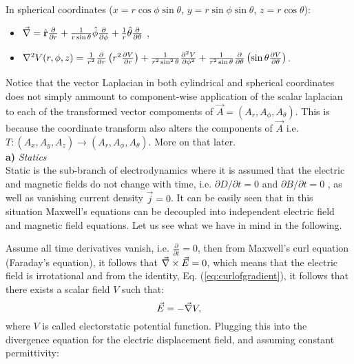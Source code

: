 \documentclass[10pt,a4paper]{report}
\def\Nabla{\ensuremath\vec{\nabla}}
\def\bm{\ensuremath\mathbf}
\def\curl{\ensuremath\Nabla\times}
\def\lap{\ensuremath\nabla^2}
\begin{document}
In spherical coordinates ($x=r\cos\phi \sin\theta$, $y = r\sin\phi\sin\theta$, $z = r\cos\theta$):
\begin{itemize}
  \item{$\Nabla = \hat{\bm{r}} \frac{\partial }{\partial r}+\frac{1}{r\sin\theta}\hat{\bm{\phi}} \frac{\partial}{\partial \phi} + \frac{1}{r}\hat{\bm{\theta}}\frac{\partial}{\partial \theta}$} ,
  \item{$\lap V(r,\phi,z) = \frac{1}{r^2}\frac{\partial}{\partial r}\left ( r^2\frac{\partial V}{\partial r}\right ) + \frac{1}{r^2 \sin^2\theta}\frac{\partial ^2 V}{\partial \phi ^2}
    + \frac{1}{r^2\sin\theta} \frac{\partial}{\partial \theta}\left ( \sin\theta \frac{\partial V}{\partial \theta } \right ) $.} 
\end{itemize}

Notice that the vector Laplacian in both cylindrical and spherical coordinates does not simply ammount to component-wise application of the scalar laplacian to each of the transformed vector compoments of $\vec{A} = (A_r,A_\phi,A_\theta)$. This is because the coordinate transform also alters the components of $\vec{A}$ i.e. $T: (A_x,A_y,A_z)\rightarrow (A_r,A_\phi,A_\theta)$. More on that later. 
\\

\textbf{a)} \emph{Statics} \\

Static is the sub-branch of electrodynamics where it is assumed that the electric and magnetic fields do not change with time, i.e. $\partial D / \partial t = 0 $ and $\partial B / \partial t = 0 $ , as well as vanishing current density  $\vec{j} = 0 $. It can be easily seen that in this situation Maxwell's equations can be decoupled into independent electric field and magnetic field equations. Let us see what we have in mind in the following. 


Assume all time derivatives vanish, i.e. $\frac{\partial }{\partial t} = 0  $, then from Maxwell's curl equation (Faraday's equation), it follows that $\curl \vec{E} = 0 $, which means that the electric field is irrotational and from the
identity, Eq. (\ref{eq:curlofgradient}), it follows that there exists a scalar field $V$ such that:
\begin{equation*}
  \vec{E}=-\Nabla V, 
\end{equation*}
where $V$ is called electorstatic potential function. Plugging this into the divergence equation for the electric displacement field, and assuming constant permittivity:
\end{document}
